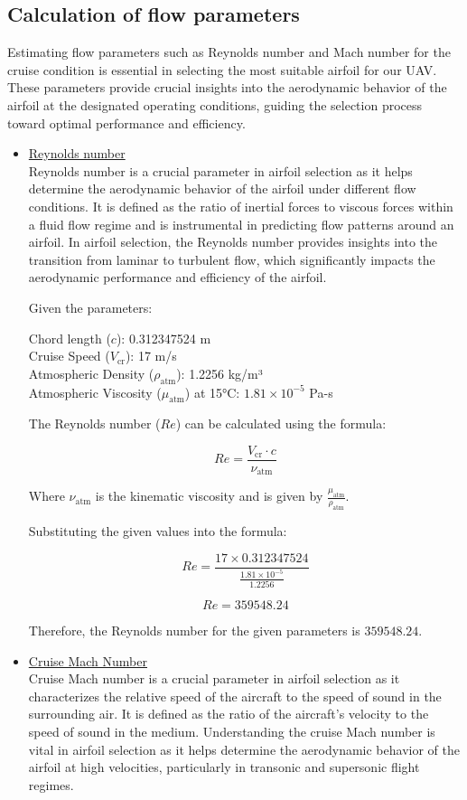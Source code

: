 \documentclass[12 pt]{article}
\begin{document}
\subsection{Calculation of flow parameters}
\color{black}
Estimating flow parameters such as Reynolds number and Mach number for the cruise condition is essential in selecting the most suitable airfoil for our UAV. These parameters provide crucial insights into the aerodynamic behavior of the airfoil at the designated operating conditions, guiding the selection process toward optimal performance and efficiency. 
\color{red}
\begin{itemize}
\item{\underline{Reynolds number}}
\color{black}
\\Reynolds number is a crucial parameter in airfoil selection as it helps determine the aerodynamic behavior of the airfoil under different flow conditions. It is defined as the ratio of inertial forces to viscous forces within a fluid flow regime and is instrumental in predicting flow patterns around an airfoil. In airfoil selection, the Reynolds number provides insights into the transition from laminar to turbulent flow, which significantly impacts the aerodynamic performance and efficiency of the airfoil.

Given the parameters:

 Chord length (\( c \)): 0.312347524 m\\
 Cruise Speed (\( V_{\text{cr}} \)): 17 m/s\\
 Atmospheric Density (\( \rho_{\text{atm}} \)): 1.2256 kg/m³\\
 Atmospheric Viscosity (\( \mu_{\text{atm}} \)) at 15°C: \( 1.81 \times 10^{-5} \) Pa-s

The Reynolds number (\( Re \)) can be calculated using the formula:

\[
Re = \frac{V_{\text{cr}} \cdot c}{\nu_{\text{atm}}} \tag{6.2}
\]

Where \( \nu_{\text{atm}} \) is the kinematic viscosity and is given by \( \frac{\mu_{\text{atm}}}{\rho_{\text{atm}}} \).

Substituting the given values into the formula:

\[
Re = \frac{17 \times 0.312347524}{\frac{1.81 \times 10^{-5}}{1.2256}} \tag{6.3}
\]

\[
Re = 359548.24
\]

Therefore, the Reynolds number for the given parameters is \( 359548.24 \). 
\color{red}
\item{\underline{Cruise Mach Number}}
\color{black}
\\Cruise Mach number is a crucial parameter in airfoil selection as it characterizes the relative speed of the aircraft to the speed of sound in the surrounding air. It is defined as the ratio of the aircraft's velocity to the speed of sound in the medium. Understanding the cruise Mach number is vital in airfoil selection as it helps determine the aerodynamic behavior of the airfoil at high velocities, particularly in transonic and supersonic flight regimes.


\end{itemize}
\end{document}
